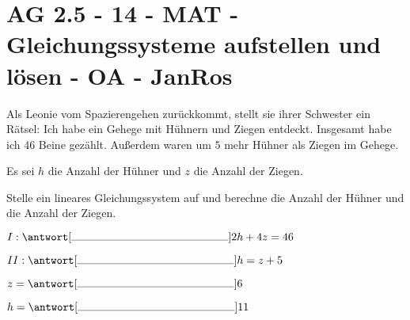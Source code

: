 \section{AG 2.5 - 14 - MAT - Gleichungssysteme aufstellen und lösen - OA - JanRos}

\begin{beispiel}[AG 2.5]{1} %
Als Leonie vom Spazierengehen zurückkommt, stellt sie ihrer Schwester ein Rätsel: \glqq Ich habe ein Gehege mit Hühnern und Ziegen entdeckt. Insgesamt habe ich $46$ Beine gezählt. Außerdem waren um $5$ mehr Hühner als Ziegen im Gehege.\grqq

Es sei $h$ die Anzahl der Hühner und $z$ die Anzahl der Ziegen.

Stelle ein lineares Gleichungssystem auf und berechne die Anzahl der Hühner und die Anzahl der Ziegen.

$I:\antwort[\rule{5cm}{0.3pt}]{2h+4z=46}$

$II:\antwort[\rule{5cm}{0.3pt}]{h=z+5}$

$z=\antwort[\rule{5cm}{0.3pt}]{6}$

$h=\antwort[\rule{5cm}{0.3pt}]{11}$

\end{beispiel}
